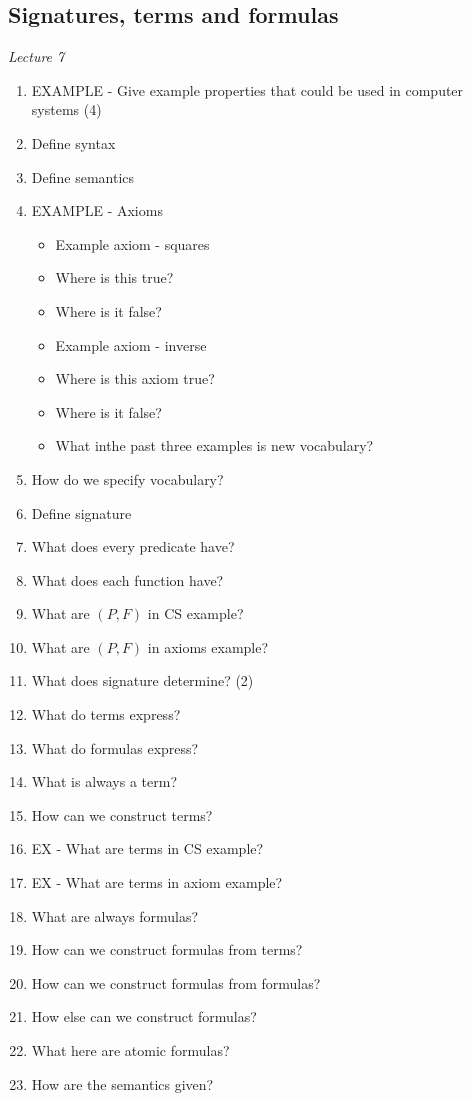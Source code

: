 \documentclass[fleqn]{article}
\begin{document}
\subsection{Signatures, terms and formulas}
\textit{Lecture 7}
\begin{enumerate}
    \item EXAMPLE - Give example properties that could be used in computer systems (4)
    \item Define syntax
    \item Define semantics
    \item EXAMPLE - Axioms
    \begin{itemize}
        \item Example axiom - squares
        \item Where is this true?
        \item Where is it false?
        \item Example axiom - inverse
        \item Where is this axiom true?
        \item Where is it false?
        \item What inthe past three examples is new vocabulary?
    \end{itemize}
    \item How do we specify vocabulary?
    \item Define signature
    \item What does every predicate have?
    \item What does each function have?
    \item What are $(P, F)$ in CS example?
    \item What are $(P, F)$ in axioms example?
    \item What does signature determine? (2)
    \item What do terms express?
    \item What do formulas express?
    \item What is always a term?
    \item How can we construct terms?
    \item EX - What are terms in CS example?
    \item EX - What are terms in axiom example?
    \item What are always formulas?
    \item How can we construct formulas from terms?
    \item How can we construct formulas from formulas?
    \item How else can we construct formulas?
    \item What here are atomic formulas?
    \item How are the semantics given?
\end{enumerate}
\end{document}
